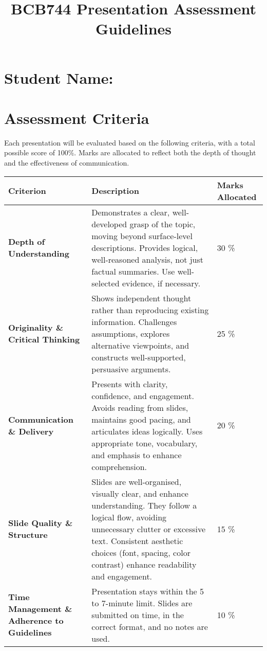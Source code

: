 \documentclass[a4paper,10pt]{article}
\title{\textbf{BCB744 Presentation Assessment Guidelines}}
\author{}
\date{}
\begin{document}
\maketitle

\section*{Student Name: \underline{\hspace{5cm}}}

\section*{Assessment Criteria}
Each presentation will be evaluated based on the following criteria, with a total possible score of 100\%. Marks are allocated to reflect both the depth of thought and the effectiveness of communication.

{\small
\begin{longtable}{R{3.5cm} R{8.5cm} R{3cm}}
    \toprule
    \textbf{Criterion} & \textbf{Description} & \textbf{Marks Allocated} \\
    \midrule
    \textbf{Depth of Understanding} & Demonstrates a clear, well-developed grasp of the topic, moving beyond surface-level descriptions. Provides logical, well-reasoned analysis, not just factual summaries. Use well-selected evidence, if necessary. & 30 \% \\
    \textbf{Originality \& Critical Thinking} & Shows independent thought rather than reproducing existing information. Challenges assumptions, explores alternative viewpoints, and constructs well-supported, persuasive arguments. & 25 \% \\
    \textbf{Communication \& Delivery} & Presents with clarity, confidence, and engagement. Avoids reading from slides, maintains good pacing, and articulates ideas logically. Uses appropriate tone, vocabulary, and emphasis to enhance comprehension. & 20 \% \\
    \textbf{Slide Quality \& Structure} & Slides are well-organised, visually clear, and enhance understanding. They follow a logical flow, avoiding unnecessary clutter or excessive text. Consistent aesthetic choices (font, spacing, color contrast) enhance readability and engagement. & 15 \% \\
    \textbf{Time Management \& Adherence to Guidelines} & Presentation stays within the 5 to 7-minute limit. Slides are submitted on time, in the correct format, and no notes are used. & 10 \% \\
    \bottomrule
\end{longtable}}
\end{document}
